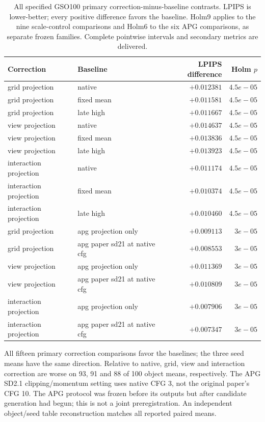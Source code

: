 \documentclass[11pt]{article}
\begin{document}
\begin{table}[ht]\centering\small
\begin{tabular}{llrr}
\toprule
Correction & Baseline & LPIPS difference & Holm $p$ \\
\midrule
grid projection & native & $+0.012381$ & $4.5e-05$ \\
grid projection & fixed mean & $+0.011581$ & $4.5e-05$ \\
grid projection & late high & $+0.011667$ & $4.5e-05$ \\
view projection & native & $+0.014637$ & $4.5e-05$ \\
view projection & fixed mean & $+0.013836$ & $4.5e-05$ \\
view projection & late high & $+0.013923$ & $4.5e-05$ \\
interaction projection & native & $+0.011174$ & $4.5e-05$ \\
interaction projection & fixed mean & $+0.010374$ & $4.5e-05$ \\
interaction projection & late high & $+0.010460$ & $4.5e-05$ \\
grid projection & apg projection only & $+0.009113$ & $3e-05$ \\
grid projection & apg paper sd21 at native cfg & $+0.008553$ & $3e-05$ \\
view projection & apg projection only & $+0.011369$ & $3e-05$ \\
view projection & apg paper sd21 at native cfg & $+0.010809$ & $3e-05$ \\
interaction projection & apg projection only & $+0.007906$ & $3e-05$ \\
interaction projection & apg paper sd21 at native cfg & $+0.007347$ & $3e-05$ \\
\bottomrule\end{tabular}
\caption{All specified GSO100 primary correction-minus-baseline contrasts. LPIPS is lower-better; every positive difference favors the baseline. Holm9 applies to the nine scale-control comparisons and Holm6 to the six APG comparisons, as separate frozen families. Complete pointwise intervals and secondary metrics are delivered.}
\end{table}

All fifteen primary correction comparisons favor the baselines; the three seed means have the same direction. Relative to native, grid, view and interaction correction are worse on 93, 91 and 88 of 100 object means, respectively. The APG SD2.1 clipping/momentum setting uses native CFG 3, not the original paper's CFG 10. The APG protocol was frozen before its outputs but after candidate generation had begun; this is not a joint preregistration. An independent object/seed table reconstruction matches all reported paired means.
\end{document}
